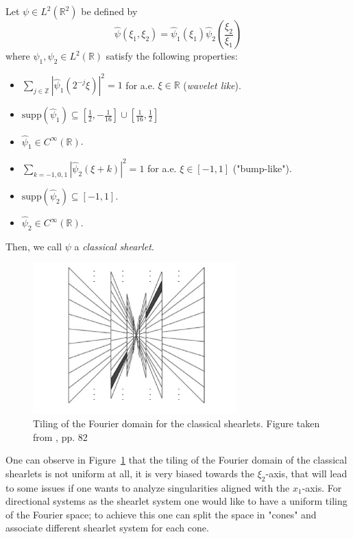 \begin{defn}
\label{def:classical_shearlets}
Let $\psi\in L^2(\mathbb{R}^2)$ be defined by
$$
\hat{\psi}(\xi_1,\xi_2)=\hat{\psi}_1(\xi_1)\hat{\psi}_2\left(\frac{\xi_2}{\xi_1}\right)
$$
where $\psi_1,\psi_2\in L^2(\mathbb{R})$ satisfy the following properties:
\begin{itemize}
\item $\sum_{j\in\mathbb{Z}} |\hat{\psi}_1(2^{-j}\xi)|^2=1$ for a.e. $\xi\in\mathbb{R}$ (\textit{wavelet like}).
\item $\text{supp}(\hat{\psi}_1)\subseteq \left[ \frac{1}{2},-\frac{1}{16}\right]\cup\left[\frac{1}{16},\frac{1}{2}\right]$
\item $\hat{\psi}_1\in C^{\infty}(\mathbb{R})$.
\item $\sum_{k=-1,0,1}|\hat{\psi}_2(\xi+k)|^2=1$ for a.e. $\xi\in [-1,1]$ ("bump-like").
\item $\text{supp}(\hat{\psi}_2)\subseteq [-1,1]$.
\item $\hat{\psi}_2\in C^{\infty}(\mathbb{R})$.
\end{itemize}
Then, we call $\psi$ a \textit{classical shearlet}.
\end{defn}

\begin{figure}[!tbp]
  \centering
   \includegraphics[width=0.7\textwidth]{./Diagrams/tiling_nocone.jpg}
    \caption{Tiling of the Fourier domain for the classical shearlets. Figure taken from \cite{Gitta-notes}, pp. 82}
  \label{fig:tiling_nocone}

\end{figure}

One can observe in Figure~\ref{fig:tiling_nocone} that the tiling of the Fourier domain of the classical shearlets is not uniform at all, it is very biased towards the $\xi_2$-axis, that will lead to some issues if one wants to analyze singularities aligned with the $x_1$-axis. For directional systems as the shearlet system one would like to have a uniform tiling of the Fourier space; to achieve this one can split the space in "cones" and associate different shearlet system for each cone. 

